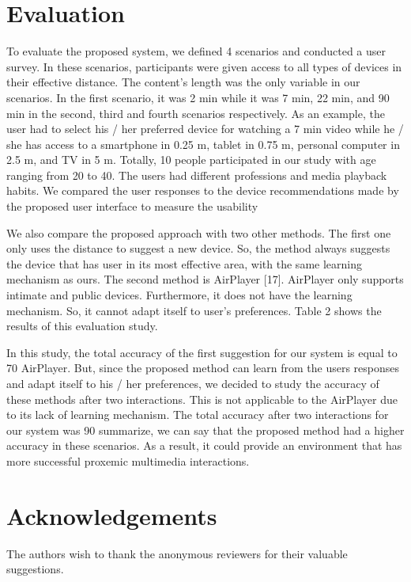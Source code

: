 \documentclass[]{IEEEphot}
\begin{document}
\section{Evaluation}
 To evaluate the proposed system, we defined 4 scenarios and conducted a user
survey. In these scenarios, participants were given access to all types of devices
in their effective distance. The content’s length was the only variable in our
scenarios. In the first scenario, it was 2 min while it was 7 min, 22 min, and 90
min in the second, third and fourth scenarios respectively. As an example, the
user had to select his / her preferred device for watching a 7 min video while he
/ she has access to a smartphone in 0.25 m, tablet in 0.75 m, personal computer
in 2.5 m, and TV in 5 m. Totally, 10 people participated in our study with age
ranging from 20 to 40. The users had different professions and media playback
habits. We compared the user responses to the device recommendations made
by the proposed user interface to measure the usability




We also compare the proposed approach with two other methods. The first
one only uses the distance to suggest a new device. So, the method always suggests the device that has user in its most effective area, with the same learning
mechanism as ours. The second method is AirPlayer [17]. AirPlayer only supports intimate and public devices. Furthermore, it does not have the learning
mechanism. So, it cannot adapt itself to user’s preferences. Table 2 shows the
results of this evaluation study.


In this study, the total accuracy of the first suggestion for our system is
equal to 70%
AirPlayer. But, since the proposed method can learn from the users responses
and adapt itself to his / her preferences, we decided to study the accuracy of
these methods after two interactions. This is not applicable to the AirPlayer
due to its lack of learning mechanism. The total accuracy after two interactions
for our system was 90%
summarize, we can say that the proposed method had a higher accuracy in these
scenarios. As a result, it could provide an environment that has more successful
proxemic multimedia interactions.

\section*{Acknowledgements}
The authors wish to thank the anonymous reviewers for their valuable suggestions.  
\end{document}
